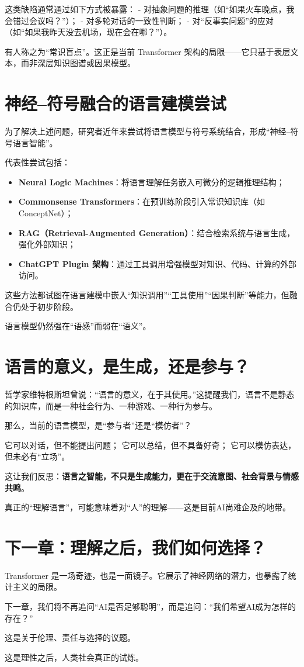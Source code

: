 这类缺陷通常通过如下方式被暴露：
- 对抽象问题的推理（如“如果火车晚点，我会错过会议吗？”）；
- 对多轮对话的一致性判断；
- 对“反事实问题”的应对（如“如果我昨天没去机场，现在会在哪？”）。

有人称之为“常识盲点”。这正是当前 Transformer 架构的局限——它只基于表层文本，而非深层知识图谱或因果模型。

\section*{神经–符号融合的语言建模尝试}

为了解决上述问题，研究者近年来尝试将语言模型与符号系统结合，形成“神经–符号语言智能”。

代表性尝试包括：

\begin{itemize}
\item \textbf{Neural Logic Machines}：将语言理解任务嵌入可微分的逻辑推理结构；
\item \textbf{Commonsense Transformers}：在预训练阶段引入常识知识库（如 ConceptNet）；
\item \textbf{RAG（Retrieval-Augmented Generation）}：结合检索系统与语言生成，强化外部知识；
\item \textbf{ChatGPT Plugin 架构}：通过工具调用增强模型对知识、代码、计算的外部访问。
\end{itemize}

这些方法都试图在语言建模中嵌入“知识调用”“工具使用”“因果判断”等能力，但融合仍处于初步阶段。

语言模型仍然强在“语感”而弱在“语义”。

\section*{语言的意义，是生成，还是参与？}

哲学家维特根斯坦曾说：“语言的意义，在于其使用。”这提醒我们，语言不是静态的知识库，而是一种社会行为、一种游戏、一种行为参与。

那么，当前的语言模型，是“参与者”还是“模仿者”？

它可以对话，但不能提出问题；
它可以总结，但不具备好奇；
它可以模仿表达，但未必有“立场”。

这让我们反思：\textbf{语言之智能，不只是生成能力，更在于交流意图、社会背景与情感共鸣}。

真正的“理解语言”，可能意味着对“人”的理解——这是目前AI尚难企及的地带。

\section*{下一章：理解之后，我们如何选择？}

Transformer 是一场奇迹，也是一面镜子。它展示了神经网络的潜力，也暴露了统计主义的局限。

下一章，我们将不再追问“AI是否足够聪明”，而是追问：“我们希望AI成为怎样的存在？”

这是关于伦理、责任与选择的议题。

这是理性之后，人类社会真正的试炼。

\nocite{*}
\printbibliography[heading=bibintoc, title=\ebibname]
\appendix

\newpage


